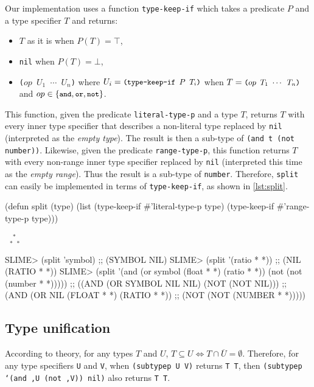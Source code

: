 \documentclass[format=sigconf]{acmart}
\newcommand\asterism{\medskip\noindent\textcolor{black!65}{\small\centerline{$\phantom{x}_{*\,\,\,*}^{\,\,\,*}$}}\smallskip}
\newcommand\code[2][\small]{\sloppy\texttt{#1#2}}
\theoremstyle{definition}
\begin{document}
Our implementation uses a function \code{type-keep-if} which takes a predicate
$P$ and a type specifier $T$ and returns:
\begin{itemize}
  \newcommand\mcode[1]{\text{\code{#1}}}
\item $T$ as it is when $P(T) = \top$,
\item \code{nil} when $P(T) = \bot$,
\item \code{($op$ $U_1$ $\cdots$ $U_n$)}
  where \(U_i = \mcode{(type-keep-if $P$ $T_i$)}\)
  when \(T = \mcode{($op$ $T_1$ $\cdots$ $T_n$)}\)
  and $op \in \{\mcode{and}, \mcode{or}, \mcode{not}\}$.
\end{itemize}
This function, given the predicate \code{literal-type-p} and a type $T$, returns
$T$ with every inner type specifier that describes a non-literal type
replaced by \code{nil} (interpreted as the \textit{empty type}). The result is then a
sub-type of \code{(and t (not number))}.
Likewise, given the predicate \code{range-type-p}, this function returns $T$
with every non-range inner type specifier replaced by \code{nil} (interpreted
this time as the \textit{empty range}). Thus the result is a sub-type of \code{number}.
Therefore, \code{split} can easily be implemented in terms of
\code{type-keep-if}, as shown in \vref{lst:split}.

\begin{listing}
\begin{clcode}
(defun split (type)
  (list (type-keep-if #'literal-type-p type)
        (type-keep-if #'range-type-p type)))
\end{clcode}
\asterism
\begin{clcode}
SLIME> (split 'symbol)
;; (SYMBOL NIL)
SLIME> (split '(ratio * *))
;; (NIL (RATIO * *))
SLIME> (split  '(and (or symbol (float * *) (ratio * *))
                     (not (not (number * *)))))
;; ((AND (OR SYMBOL NIL NIL) (NOT (NOT NIL)))
;;  (AND (OR NIL (FLOAT * *) (RATIO * *))
;;       (NOT (NOT (NUMBER * *)))))
\end{clcode}
\caption{The \code{split} function}
\label{lst:split}
\end{listing}

\subsection{Type unification}
According to theory, for any types $T$ and $U$,
\(T \subseteq U \Leftrightarrow T \cap \overline{U} = \emptyset\).
Therefore, for any type specifiers \code{U} and \code{V}, when
\code{(subtypep U V)} returns \code{T T}, then
\code{(subtypep `(and ,U (not ,V)) nil)} also returns \code{T T}.
\end{document}
